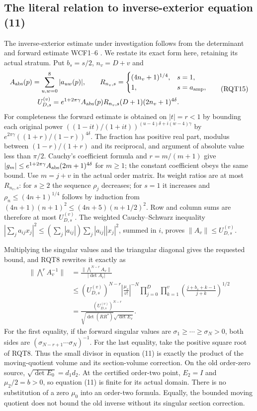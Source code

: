 \subsection{The literal relation to inverse-exterior equation (11)}
The inverse-exterior estimate under investigation follows from
the determinant and forward estimate WCF1--6 \cite{WCF}.
We restate its exact form here, retaining its actual stratum.
Put $b_s=s/2$, $n_v=D+v$ and
\[
\begin{gathered}
 A_{\rm abs}(p)=\sum_{u,w=0}^{8}|a_{uw}(p)|,\qquad
 R_{n_v,s}=\begin{cases}(4n_v+1)^{1/4},&s=1,\\1,&s=a_{\rm amp},\end{cases}\\
 U_{D,s}^{(v)}=e^{1+2\pi\gamma}A_{\rm abs}(p)
                 R_{n_v,s}(D+1)(2n_v+1)^{4\delta}.
\end{gathered}\tag{RQT15}
\]
For completeness the forward estimate is obtained on $|t|=r<1$
by bounding each original power
$((1-it)/(1+it))^{(u-4)\delta+i(w-4)\gamma}$ by
$e^{2\pi\gamma}((1+r)/(1-r))^{4\delta}$.
The fraction has positive real part, modulus between
$(1-r)/(1+r)$ and its reciprocal, and argument of absolute
value less than $\pi/2$.  Cauchy's coefficient formula and
$r=m/(m+1)$ give
$|g_m|\le e^{1+2\pi\gamma}A_{\rm abs}(2m+1)^{4\delta}$
for $m\ge1$; the constant coefficient obeys the same bound.
Use $m=j+v$ in the actual order matrix.  Its weight ratios
are at most $R_{n_v,s}$: for $s\ge2$ the sequence $\rho_j$
decreases; for $s=1$ it increases and
$\rho_n\le(4n+1)^{1/4}$ follows by induction from
$(4n+1)(n+1)^2\le(4n+5)(n+1/2)^2$.
Row and column sums are therefore at most $U_{D,s}^{(v)}$.
The weighted Cauchy--Schwarz inequality
$|\sum_j a_{ij}x_j|^2\le(\sum_j|a_{ij}|)
\sum_j|a_{ij}||x_j|^2$, summed in $i$, proves
$\|A_v\|\le U_{D,s}^{(v)}$.

Multiplying the singular values and the triangular diagonal gives
the requested bound, and RQT8 rewrites it exactly as
\[
\begin{aligned}
 \|\bigwedge^r A_v^{-1}\|
 &=\frac{\|\bigwedge^{N-r} A_v\|}{|\det A_v|}\\
 &\le (U_{D,s}^{(v)})^{N-r}
       \left|\frac{\mu_v}{v!}\right|^{-N}
       \prod_{j=0}^D\prod_{k=1}^v
         \left(\frac{j+b_s+k-1}{j+k}\right)^{1/2}\\
 &=\frac{(U_{D,s}^{(v)})^{N-r}}
       {\sqrt{\det(RR^*)}\sqrt{\det E_v}}.
\end{aligned}\tag{RQT16}
\]
For the first equality, if the forward singular values are
$\sigma_1\ge\cdots\ge\sigma_N>0$, both sides are
$(\sigma_{N-r+1}\cdots\sigma_N)^{-1}$.
For the last equality, take the positive square root of RQT8.
Thus the small divisor in equation (11) is exactly the product
of the moving-quotient volume and its section-volume correction.
On the old order-zero source, $\sqrt{\det E_0}=d_1d_2$.
At the certified order-two point, $E_2=I$ and
$\mu_2/2=b>0$, so equation (11) is finite for its actual domain.
There is no substitution of a zero $\mu_0$ into an order-two
formula.  Equally, the bounded moving quotient does not bound
the old inverse without its singular section correction.

